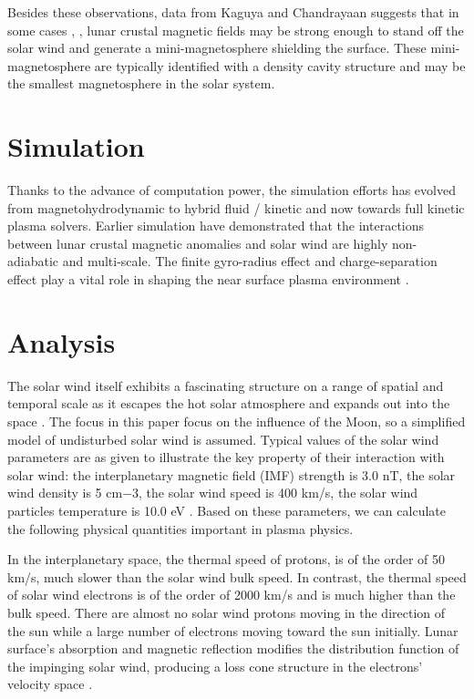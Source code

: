 Besides these observations, data from Kaguya and Chandrayaan suggests that in some cases \citep{wieserFirstObservationMinimagnetosphere2010}, \cite{kurataMinimagnetosphereReinerGamma2005}, lunar crustal magnetic fields may be strong enough to stand off the solar wind and generate a mini-magnetosphere shielding the surface. These mini-magnetosphere are typically identified with a density cavity structure and may be the smallest magnetosphere in the solar system.

\section{Simulation}

Thanks to the advance of computation power, the simulation efforts has evolved from magnetohydrodynamic to hybrid fluid / kinetic and now towards full kinetic plasma solvers. Earlier simulation have demonstrated that the interactions between lunar crustal magnetic anomalies and solar wind are highly non-adiabatic and multi-scale. The finite gyro-radius effect and charge-separation effect play a vital role in shaping the near surface plasma environment \citep{decaThreedimensionalFullkineticSimulation2016, decaGeneralMechanismDynamics2015, decaElectromagneticParticleinCellSimulations2014}.

\section{Analysis}


The solar wind itself exhibits a fascinating structure on a range of spatial and temporal scale as it escapes the hot solar atmosphere and expands out into the space \citep{owensSolarWindStructure2020}. The focus in this paper focus on the influence of the Moon, so a simplified model of undisturbed solar wind is assumed. Typical values of the solar wind parameters are as given to illustrate the key property of their interaction with solar wind: the interplanetary magnetic field (IMF) strength is 3.0 nT, the solar wind density is 5 cm−3, the solar wind speed is 400 km/s, the solar wind particles temperature is 10.0 eV \citep{haradaUpstreamWavesParticles2016}. Based on these parameters, we can calculate the following physical quantities important in plasma physics.

In the interplanetary space, the thermal speed of protons, is of the order of 50 km/s, much slower than the solar wind bulk speed. In contrast, the thermal speed of solar wind electrons is of the order of 2000 km/s and is much higher than the bulk speed. There are almost no solar wind protons moving in the direction of the sun while a large number of electrons moving toward the sun initially. Lunar surface's absorption and magnetic reflection modifies the distribution function of the impinging solar wind, producing a loss cone structure in the electrons' velocity space \citep{halekasSolarWindElectron2012}.

